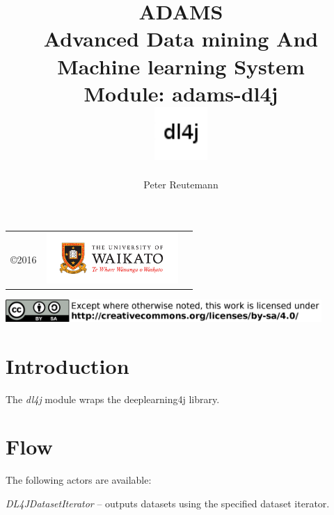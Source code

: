 \documentclass[a4paper]{book}
\title{
  \textbf{ADAMS} \\
  {\Large \textbf{A}dvanced \textbf{D}ata mining \textbf{A}nd \textbf{M}achine
  learning \textbf{S}ystem} \\
  {\Large Module: adams-dl4j} \\
  \vspace{1cm}
  \includegraphics[width=2cm]{images/dl4j-module.png} \\
}
\author{
  Peter Reutemann
}
\begin{document}
\begin{titlepage}
\maketitle

\thispagestyle{empty}
\center
\begin{table}[b]
	\begin{tabular}{c l l}
		\parbox[c][2cm]{2cm}{\copyright 2016} &
		\parbox[c][2cm]{5cm}{\includegraphics[width=5cm]{images/coat_of_arms.pdf}} \\
	\end{tabular}
	\includegraphics[width=12cm]{images/cc.png} \\
\end{table}

\end{titlepage}

\tableofcontents
\listoffigures

\chapter{Introduction}
The \textit{dl4j} module wraps the deeplearning4j\cite{dl4j} library.

\chapter{Flow}

The following actors are available:
\begin{tight_itemize}
  \item \textit{DL4JDatasetIterator} -- outputs datasets using the specified
  dataset iterator.
\end{tight_itemize}


\end{document}
